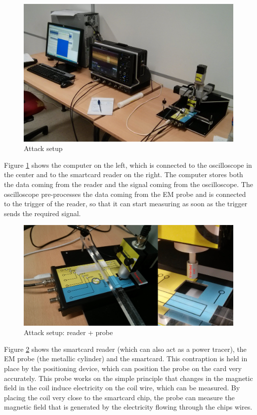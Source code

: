 \documentclass{llncs}
\begin{document}
\begin{figure}
    \centering
    \includegraphics[width=\textwidth]{img/IMG_20140523_171003}
    \caption[]{Attack setup}
    \label{fig:setup}
\end{figure}

Figure \ref{fig:setup} shows the computer on the left, which is connected to
the oscilloscope in the center and to the smartcard reader on the right. The
computer stores both the data coming from the reader and the signal coming from
the oscilloscope. The oscilloscope pre-processes the data coming from the EM
probe and is connected to the trigger of the reader, so that it can start
measuring as soon as the trigger sends the required signal.

\begin{figure}
    \centering
    \includegraphics[width=\textwidth]{img/setup_probe}
    \caption[]{Attack setup: reader + probe}
    \label{fig:setupreader}
\end{figure}

Figure \ref{fig:setupreader} shows the smartcard reader (which can also act as
a power tracer), the EM probe (the metallic cylinder) and the smartcard. This
contraption is held in place by the positioning device, which can position the
probe on the card very accurately. This probe works on the simple principle
that changes in the magnetic field in the coil induce electricity on the coil
wire, which can be measured. %
By placing the coil very close to the smartcard chip, the probe can measure the
magnetic field that is generated by the electricity flowing through the chips
wires.
\end{document}
